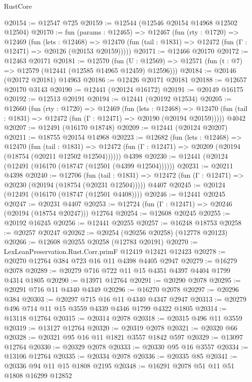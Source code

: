 \begin{lexlean}{RustCore}
\begin{coremodule}
@20154 := @12547 @725
@20159 := @12544 (@12546 @20154 @14968 @12502 @12504)
@20170 := fun (params : @12465) =>
  @12467
    (fun (rty : @1720) =>
    @12469
      (fun (lets : @12468) =>
      @12470 (fun (tail : @1831) => @12472 (fun (Γ : @12471) => @20126 (@20153 @20159)))))
@20171 := @12466 @20170
@20172 := @12463 @20171
@20181 := @12570
    (fun (U : @12569) => @12571 (fun (t : @7) => @12579 (@12441 (@12585 @14965 @12459) @12596)))
@20184 := @20146 (@20172 @20181) @14963
@20186 := @12426 @20171 @20181
@20188 := @12657 @20170 @3143
@20190 := @12441 (@20124 @16172)
@20191 := @20149 @16175
@20192 := @12513 @20191
@20194 := @12441 (@20192 @12534)
@20205 := @12660
    (fun (rty : @1720) =>
    @12469
      (fun (lets : @12468) =>
      @12470 (fun (tail : @1831) => @12472 (fun (Γ : @12471) => @20190 (@20194 @20159)))))
    @4042
@20207 := @12491 (@16170 @18748)
@20209 := @12441 (@20124 @20207)
@20211 := @18755 @20154 @14968
@20223 := @12682
    (fun (lets : @12468) =>
    @12470
      (fun (tail : @1831) =>
      @12472 (fun (Γ : @12471) => @20209 (@20194 (@18754 (@20211 @12502 @12504))))))
    @4398
@20230 := @12441 (@20124 (@12491 (@16170 (@18747 (@12501 (@4399 @12504))))))
@20231 := @20211 @4398
@20240 := @12706
    (fun (tail : @1831) => @12472 (fun (Γ : @12471) => @20230 (@20194 (@18754 (@20231 @12504)))))
    @4407
@20245 := @20124 (@12491 (@16170 (@18747 (@12501 @4408))))
@20246 := @12441 @20245
@20247 := @20231 @4407
@20253 := @12724 (fun (Γ : @12471) => @20246 (@20194 (@18754 @20247))) @12764
@20254 := @12608 @20245
@20255 := @20192 @16245
@20256 := @12441 @20255
@20257 := @16248 @18753
@20258 := @20257 @20247
@20262 := @20254 (@20256 @20258) (@12778 @20123)
@20266 := @12608 @20255 @20258 (@12783 @20191)
@20270 := LexLeanPreservation.Rust.Corr.primF @12419 @12421 @12423
@20278 := @20270 @12764 @384 @723 @16 @11 @4398 @4405 @2947
@20279 := @16279 @2078
@20289 := @20279 @716 @722 @11 @15 @4351 @4397 @4404 @1799 @4314 @1805
@20290 := @13971 @12764
@20291 := @20290 @2078
@20295 := @20291 @716 @11 @4340 @4349
@20296 := @16270 @2078
@20297 := @20296 @384
@20303 := @20297 @715 @16 @11 @4340 @4347 @2947
@20313 := @20279 @496 @714 @11 @15 @3559 @4339 @4346 @1799 @4322 @1805
@20314 := @13118 @12764
@20315 := @20314 @2078
@20318 := @20315 @496 @11 @3559
@20319 := @13127 @12764
@20320 := @20319 @2078
@20321 := @20320 @66
@20328 := @20321 @95 @16 @11 @1821 @3557 @1842 @597
@20329 := @13097 @12764
@20330 := @20329 @2078
@20333 := @20330 @95 @16 @3557
@20334 := @13106 @12764
@20335 := @20334 @2078
@20336 := @20335 @85
@20341 := @20336 @94 @11 @15 @1808 @2195
@20348 := @16291 @2078 @51 @11 @51 @1808 @16299 @12852

\end{coremodule}
\end{lexlean}
